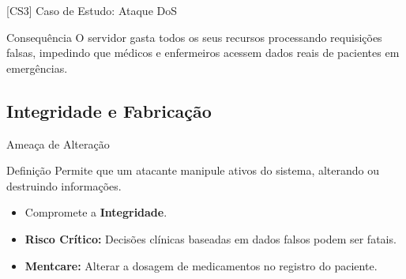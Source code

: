 \documentclass[aspectratio=169]{beamer}
\begin{document}
\begin{frame}{[CS3] Caso de Estudo: Ataque DoS}
    \centering
    \vspace{0.5cm}
    \begin{alertblock}{Consequência}
        O servidor gasta todos os seus recursos processando requisições falsas, impedindo que médicos e enfermeiros acessem dados reais de pacientes em emergências.
    \end{alertblock}
\end{frame}

\subsection{Integridade e Fabricação}
\begin{frame}{Ameaça de Alteração}
    \begin{block}{Definição}
        Permite que um atacante manipule ativos do sistema, alterando ou destruindo informações.
    \end{block}
    \begin{itemize}
        \item Compromete a \textbf{Integridade}.
        \item \textbf{Risco Crítico:} Decisões clínicas baseadas em dados falsos podem ser fatais.
        \item \textbf{Mentcare:} Alterar a dosagem de medicamentos no registro do paciente.
    \end{itemize}
\end{frame}
\end{document}
